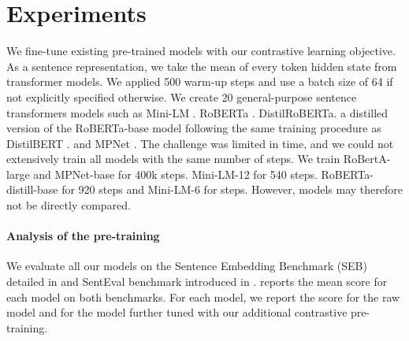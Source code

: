 \section{Experiments}

We fine-tune existing pre-trained models with our contrastive learning objective. As a sentence representation, we take the mean of every token hidden state from transformer models. We applied 500 warm-up steps and use a batch size of 64 if not explicitly specified otherwise. We create 20 general-purpose sentence transformers models such as Mini-LM \parencite{wang_20a}. RoBERTa \parencite{liu_2019}. DistilRoBERTa. a distilled version of the RoBERTa-base model following the same training procedure as DistilBERT \parencite{sanh_19}. and MPNet \parencite{song_20}. The challenge was limited in time, and we could not extensively train all models with the same number of steps. We train RoBertA-large and MPNet-base for 400k steps. Mini-LM-12 for 540 steps. RoBERTa-distill-base for 920 steps and Mini-LM-6 for  steps. However, models may therefore not be directly compared.



\paragraph{Analysis of the pre-training} We evaluate all our models on the Sentence Embedding Benchmark (SEB) detailed in  and SentEval benchmark introduced in .  reports the mean score for each model on both benchmarks. For each model, we report the score for the raw model and for the model further tuned with our additional contrastive pre-training.

